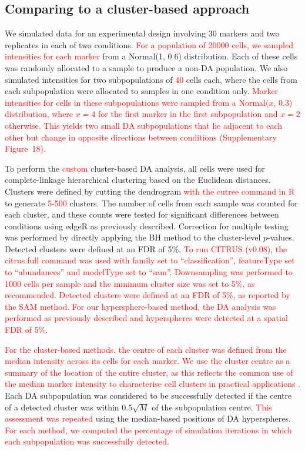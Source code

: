 \documentclass{article}
\newcommand\revised[1]{\textcolor{red}{#1}}
\newcommand{\suppfigclustersim}{18}
\begin{document}
\subsection{Comparing to a cluster-based approach}
We simulated data for an experimental design involving 30 markers and two replicates in each of two conditions.
\revised{For a population of 20000 cells, we sampled intensities for each marker} from a Normal(1, 0.6) distribution.
Each of these cells was randomly allocated to a sample to produce a non-DA population.
We also simulated intensities for two subpopulations of \revised{40} cells each, where the cells from each subpopulation were allocated to samples in one condition only.
\revised{Marker intensities for cells in these subpopulations were sampled from a Normal($x$, 0.3) distribution, where $x=4$ for the first marker in the first subpopulation and $x=2$ otherwise.
This yields two small DA subpopulations that lie adjacent to each other but change in opposite directions between conditions (Supplementary Figure~\suppfigclustersim{}).}

To perform the \revised{custom} cluster-based DA analysis, all cells were used for complete-linkage hierarchical clustering based on the Euclidean distances.
Clusters were defined by cutting the dendrogram \revised{with the cutree command in R} to generate \revised{5-500} clusters.
The number of cells from each sample was counted for each cluster, and these counts were tested for significant differences between conditions using edgeR as previously described.
Correction for multiple testing was performed by directly applying the BH method to the cluster-level $p$-values.
Detected clusters were defined at an FDR of 5\%.
\revised{To run CITRUS (v0.08), the citrus.full command was used with family set to ``classification'', featureType set to ``abundances'' and modelType set to ``sam''.
Downsampling was performed to 1000 cells per sample and the minimum cluster size was set to 5\%, as recommended.
Detected clusters were defined at an FDR of 5\%, as reported by the SAM method.
For our hypersphere-based method, the DA analysis was performed as previously described and hyperspheres were detected at a spatial FDR of 5\%.}

\revised{For the cluster-based methods, the centre of each cluster was defined from the median intensity across its cells for each marker.
We use the cluster centre as a summary of the location of the entire cluster, as this reflects the common use of the median marker intensity to characterise cell clusters in practical applications \cite{qiu2011extracting,bruggner2014automated}.}
Each DA subpopulation was considered to be successfully detected if the centre of a detected cluster was within $0.5\sqrt{M}$ of the subpopulation centre.
\revised{This assessment was repeated} using the median-based positions of DA hyperspheres.
\revised{For each method, we computed the percentage of simulation iterations in which each subpopulation was successfully detected.}
\end{document}
